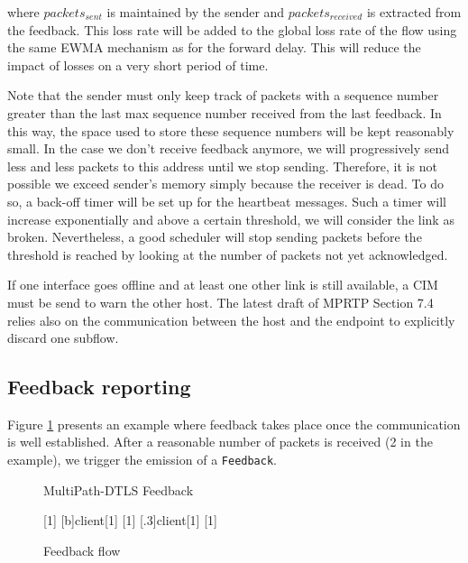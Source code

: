 where $packets_{sent}$ is maintained by the sender and $packets_{received}$ is extracted from the feedback. This loss rate will be added to the global loss rate of the flow using the same EWMA mechanism as for the forward delay. This will reduce the impact of losses on a very short period of time.

Note that the sender must only keep track of packets with a sequence number greater than the last max sequence number received from the last feedback. In this way, the space used to store these sequence numbers will be kept reasonably small. In the case we don't receive feedback anymore, we will progressively send less and less packets to this address until we stop sending. Therefore, it is not possible we exceed sender's memory simply because the receiver is dead. To do so, a back-off timer will be set up for the heartbeat messages. Such a timer will increase exponentially and above a certain threshold, we will consider the link as broken. Nevertheless, a good scheduler will stop sending packets before the threshold is reached by looking at the number of packets not yet acknowledged. 

If one interface goes offline and at least one other link is still available, a CIM must be send to warn the other host. The latest draft of MPRTP \cite{singh-avtcore-mprtp} Section 7.4 relies also on the communication between the host and the endpoint to explicitly discard one subflow.


\subsection{Feedback reporting}
\label{sec:feedbackReport}


Figure \ref{fig:feedback} presents an example where feedback takes place once the communication is well established. After a reasonable number of packets is received (2 in the example), we trigger the emission of a \texttt{Feedback}.


\begin{figure}[!ht]
\centering
\begin{msc}[r]{MultiPath-DTLS Feedback}

\setlength{\instfootheight}{0em}
\setlength{\instheadheight}{0em}
\setlength{\instdist}{0.5\linewidth}
\setlength{\levelheight}{3em}


[1]
\nextlevel
{}[b]{}{client}[1]
\nextlevel
{}[1]
\nextlevel
{}[.3]{client}[1]
\nextlevel
{}[1]
\nextlevel

\end{msc}
\caption{Feedback flow}
\label{fig:feedback}
\end{figure}

